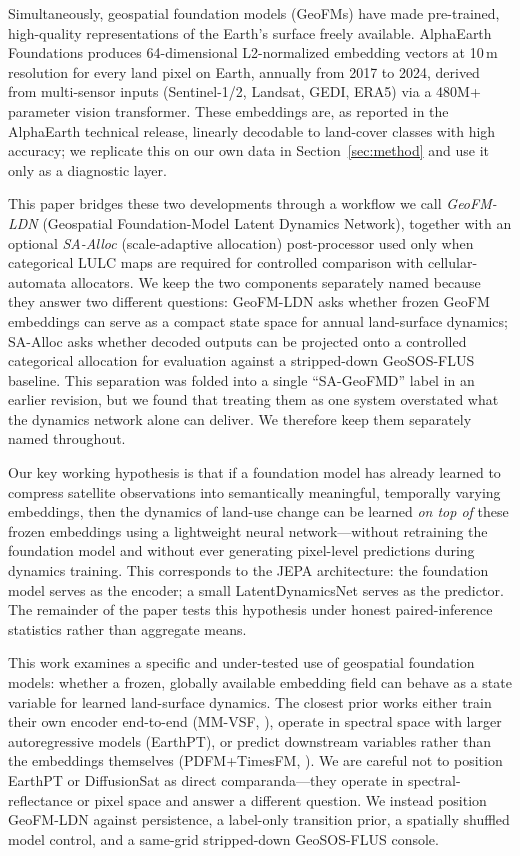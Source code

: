 \documentclass{article}
\begin{document}
Simultaneously, geospatial foundation models (GeoFMs) have made pre-trained, high-quality representations of the Earth's surface freely available. AlphaEarth Foundations \citep{brown2025alphaearth} produces 64-dimensional L2-normalized embedding vectors at 10\,m resolution for every land pixel on Earth, annually from 2017 to 2024, derived from multi-sensor inputs (Sentinel-1/2, Landsat, GEDI, ERA5) via a 480M+ parameter vision transformer. These embeddings are, as reported in the AlphaEarth technical release, linearly decodable to land-cover classes with high accuracy; we replicate this on our own data in Section~\ref{sec:method} and use it only as a diagnostic layer.

This paper bridges these two developments through a workflow we call \textit{GeoFM-LDN} (Geospatial Foundation-Model Latent Dynamics Network), together with an optional \textit{SA-Alloc} (scale-adaptive allocation) post-processor used only when categorical LULC maps are required for controlled comparison with cellular-automata allocators. We keep the two components separately named because they answer two different questions: GeoFM-LDN asks whether frozen GeoFM embeddings can serve as a compact state space for annual land-surface dynamics; SA-Alloc asks whether decoded outputs can be projected onto a controlled categorical allocation for evaluation against a stripped-down GeoSOS-FLUS baseline. This separation was folded into a single ``SA-GeoFMD'' label in an earlier revision, but we found that treating them as one system overstated what the dynamics network alone can deliver. We therefore keep them separately named throughout.

Our key working hypothesis is that if a foundation model has already learned to compress satellite observations into semantically meaningful, temporally varying embeddings, then the dynamics of land-use change can be learned \textit{on top of} these frozen embeddings using a lightweight neural network---without retraining the foundation model and without ever generating pixel-level predictions during dynamics training. This corresponds to the JEPA architecture: the foundation model serves as the encoder; a small LatentDynamicsNet serves as the predictor. The remainder of the paper tests this hypothesis under honest paired-inference statistics rather than aggregate means.

This work examines a specific and under-tested use of geospatial foundation models: whether a frozen, globally available embedding field can behave as a state variable for learned land-surface dynamics. The closest prior works either train their own encoder end-to-end (MM-VSF, \citealt{mmvsf2024}), operate in spectral space with larger autoregressive models (EarthPT), or predict downstream variables rather than the embeddings themselves (PDFM+TimesFM, \citealt{google2024pdfm}). We are careful not to position EarthPT or DiffusionSat as direct comparanda---they operate in spectral-reflectance or pixel space and answer a different question. We instead position GeoFM-LDN against persistence, a label-only transition prior, a spatially shuffled model control, and a same-grid stripped-down GeoSOS-FLUS console.
\end{document}
